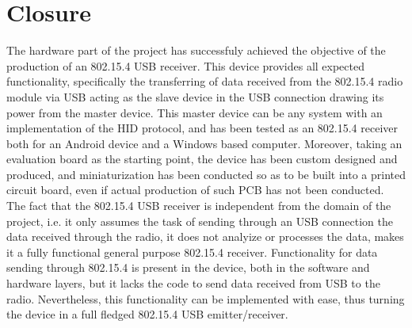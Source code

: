 		\section{Closure}
		\label{sec:hw-final}


		The hardware part of the project has successfuly achieved the objective of the production of an 802.15.4 USB receiver. This device provides all expected functionality, specifically the transferring of data received from the 802.15.4 radio module via USB acting as the slave device in the USB connection drawing its power from the master device. This master device can be any system with an implementation of the HID protocol, and has been tested as an 802.15.4 receiver both for an Android device and a Windows based computer. Moreover, taking an evaluation board as the starting point, the device has been custom designed and produced, and miniaturization has been conducted so as to be built into a printed circuit board, even if actual production of such PCB has not been conducted.\\

		The fact that the 802.15.4 USB receiver is independent from the domain of the project, i.e. it only assumes the task of sending through an USB connection the data received through the radio, it does not analyize or processes the data, makes it a fully functional general purpose 802.15.4 receiver. Functionality for data sending through 802.15.4 is present in the device, both in the software and hardware layers, but it lacks the code to send data received from USB to the radio. Nevertheless, this functionality can be implemented with ease, thus turning the device in a full fledged 802.15.4 USB emitter/receiver.\\

